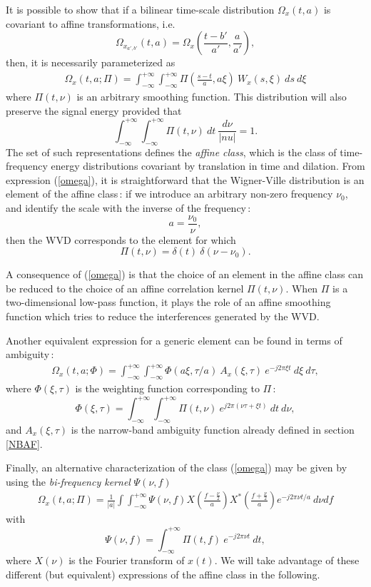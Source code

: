   It is possible to show that if a bilinear time-scale distribution
$\Omega_x(t,a)$ is covariant to affine transformations, i.e.
\[\Omega_{x_{a',b'}}(t,a)=\Omega_x\left(\frac{t-b'}{a'},\frac{a}{a'}\right),\]
then, it is necessarily parameterized as
\begin{eqnarray}
\label{omega}
\Omega_x(t,a;\Pi)=\int_{-\infty}^{+\infty}\int_{-\infty}^{+\infty}
\Pi\left(\frac{s-t}{a},a \xi\right)\ W_x(s,\xi)\ ds\ d\xi       
\end{eqnarray}
where $\Pi(t,\nu)$ is an arbitrary smoothing function. This distribution
will also preserve the signal energy provided that
\[\int_{-\infty}^{+\infty}\int_{-\infty}^{+\infty} \Pi(t,\nu)\ dt\
\frac{d\nu}{|nu|} = 1.\] The set of such representations defines the {\it
affine class}\index{affine class}, which is the class of time-frequency
energy distributions covariant by translation in time and dilation. From
expression (\ref{omega}), it is straightforward that the Wigner-Ville
distribution is an element of the affine class\,: if we introduce an
arbitrary non-zero frequency $\nu_0$, and identify the scale with the
inverse of the frequency\,:
\[a=\frac{\nu_0}{\nu},\]
then the WVD corresponds to the element for which 
\[\Pi(t,\nu)=\delta(t)\ \delta(\nu-\nu_0).\]

  A consequence of (\ref{omega}) is that the choice of an element in the
affine class can be reduced to the choice of an affine correlation kernel
$\Pi(t,\nu)$. When $\Pi$ is a two-dimensional low-pass function, it plays
the role of an affine smoothing function which tries to reduce the
interferences generated by the WVD.

  Another equivalent expression for a generic element can be found in terms
of ambiguity\,:
\begin{eqnarray}
\label{omega2}
\Omega_x(t,a;\Phi)=\int_{-\infty}^{+\infty}\int_{-\infty}^{+\infty} \Phi(a
\xi,\tau/a)\ A_x(\xi,\tau)\  e^{-j2\pi \xi t}\ d\xi\ d\tau,	   
\end{eqnarray}
where $\Phi(\xi,\tau)$ is the weighting function corresponding to $\Pi$\,:
\[\Phi(\xi,\tau)=\int_{-\infty}^{+\infty}\int_{-\infty}^{+\infty}
\Pi(t,\nu)\ e^{j2\pi(\nu \tau+\xi t)}\ dt\ d\nu,\] 
and $A_x(\xi,\tau)$ is the narrow-band ambiguity function already defined in
section \ref{NBAF}.

  Finally, an alternative characterization of the class (\ref{omega}) may
be given by using the {\it bi-frequency kernel}\index{bi-frequency kernel}
$\Psi(\nu,f)$
\begin{eqnarray}
\label{omega3}
\Omega_x(t,a;\Pi) = \frac{1}{|a|}\int\int_{-\infty}^{+\infty} \Psi(\nu,f)
X\left(\frac{f-\frac{\nu}{2}}{a}\right)
X^*\left(\frac{f+\frac{\nu}{2}}{a}\right) e^{-j2\pi\nu t/a}\ d\nu df 
\end{eqnarray}
with 
\[\Psi(\nu,f) = \int_{-\infty}^{+\infty} \Pi(t,f)\ e^{-j2\pi\nu t}\ dt,\]
where $X(\nu)$ is the Fourier transform of $x(t)$. We will take advantage of
these different (but equivalent) expressions of the affine class in the
following.

